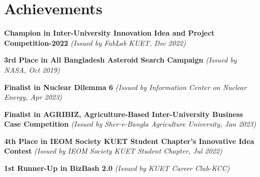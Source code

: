 \documentclass[letterpaper,10pt]{article}
\newcommand{\heading}[2]{
  \hspace{10pt}#1\hfill#2\\
}
\newcommand{\headingBf}[2]{
  \heading{\textbf{#1}}{\textbf{#2}}
}
\newenvironment{resume_list}{
  \vspace{-7pt}
  \begin{itemize}[itemsep=-2px, parsep=1pt, leftmargin=30pt]
}{
  \end{itemize}
}
\begin{document}








  \section{Achievements}
    \vspace{5pt}
    
    \begin{resume_list}
    \item \textbf{Champion in Inter-University Innovation Idea and Project Competition-2022} \textit{(Issued by FabLab KUET, Dec 2022)}
    \item \textbf{3rd Place in All Bangladesh Asteroid Search Campaign} \textit{(Issued by NASA, Oct 2019)}
    \item \textbf{Finalist in Nuclear Dilemma 6} \textit{(Issued by Information Center on Nuclear Energy, Apr 2023)}
    \item \textbf{Finalist in AGRIBIZ, Agriculture-Based Inter-University Business Case Competition} \textit{(Issued by Sher-e-Bangla Agriculture University, Jan 2023)}
    \item \textbf{4th Place in IEOM Society KUET Student Chapter's Innovative Idea Contest} \textit{(Issued by IEOM Society KUET Student Chapter, Jul 2022)}
    \item \textbf{1st Runner-Up in BizBash 2.0} \textit{(Issued by KUET Career Club-KCC)}
  \end{resume_list}
\end{document}
